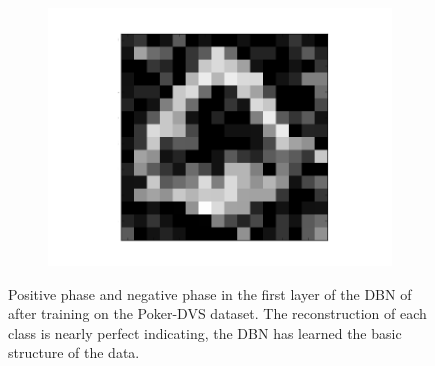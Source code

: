 \begin{figure}[h!]
\begin{subfigure}{.25\textwidth}
  		\label{fig:sub1}
	\end{subfigure}%
	\begin{subfigure}{.25\textwidth}
  		\centering
  		\includegraphics[width=.8\linewidth]{imgs/poker/recon_img8.png}
  		\label{fig:sub1}
	\end{subfigure}%
	\caption[Positive phase and negative phase in the first layer of the DBN of after training on the Poker-DVS dataset.]{Positive phase and negative phase in the first layer of the DBN of after training on the Poker-DVS dataset. The reconstruction of each class is nearly perfect indicating, the DBN has learned the basic structure of the data.}
	\label{fig:pokerrecon}
\end{figure}



